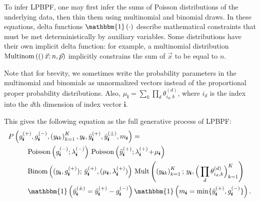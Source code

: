 \documentclass{article}
\newcommand{\subs}{\pmb{i}}
\newcommand{\wsup}[2]{#1_{\subs}^{(#2)}}
\newcommand{\ytP}{\wsup{\tilde{y}}{+}}
\newcommand{\ytPM}{\wsup{\tilde{y}}{\pm}}
\newcommand{\ysk}{y_{\subs k}}
\newcommand{\ys}{y_{\subs}}
\newcommand{\lamP}{\wsup{\lambda}{+}}
\newcommand{\lamM}{\wsup{\lambda}{-}}
\newcommand{\gP}{\wsup{g}{+}}
\newcommand{\gM}{\wsup{g}{-}}
\newcommand{\ms}{m_{\subs}}
\newcommand{\Multi}[1]{\textup{Multinom}\left( #1 \right)}
\newcommand{\Pois}[1]{\textup{Poisson}\left( #1 \right)}
\newcommand{\tp}{\!+\!}
\begin{document}
To infer LPBPF, one may first infer the sums of Poisson distributions of the
underlying data, then thin them using multinomial and binomial draws. In these
equations, delta functions $\mathbbm{1}\left( \cdot \right)$ describe
mathematical constraints that must be met deterministically by auxiliary variables. Some distributions have their own implicit
delta function: for example, a multinomial distribution $\Multi(\vec{x}; n,
\vec{p})$ implicitly constrains the sum of $\vec{x}$ to be
equal to $n$.

Note that for brevity, we sometimes write the probability parameters in the multinomial and
binomials as unnormalized vectors instead of the proportional proper probability distributions.
Also, $\mu_{\subs} = \sum_k \prod_d
\theta_{i_d,k}^{(d)}$, where $i_d$ is the index into the $d$th dimension of
index vector $\subs$.

This gives the following equation as the full generative process of LPBPF:
\begin{align} 
  P &\left(\gP, \gM, \left(\ysk\right)_{k=1}^K, \ys,
    \ytP, \ytPM, \ms\right) = \notag \\
  &\quad\quad \Pois{\gM; \lamM} \,
    \Pois { \ytP; \lamP \tp \mu_{\subs} }
    \notag \\
  &\quad\quad \text{Binom}\left((\ys, \gP);\, \ytP,(\mu_{\subs}, \lamP)\right) \, \text{Mult}\left(\left(\ysk\right)_{k=1}^K;\, \ys, \Big( \prod_d \theta_{i_d,k}^{(d)} \Big)_{k=1}^K\right) \notag \\
  &\quad\quad \mathbbm{1}\left(\ytPM =
    \ytP - \gM\right) \mathbbm{1} \left( \ms =
    \min\{\ytP, \gM\} \right) .
\label{eq:lpbpfpois}
\end{align}
\end{document}
